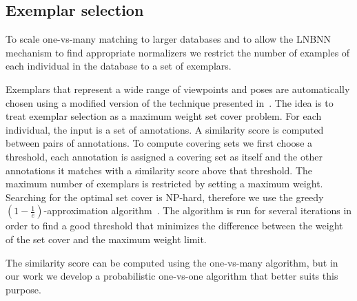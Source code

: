 \subsection{Exemplar selection}\label{sec:exempselect}
    To scale one-vs-many matching to larger databases and to allow the LNBNN
    mechanism to find appropriate normalizers we restrict the number of
    examples of each individual in the database to a set of exemplars.

    Exemplars that represent a wide range of viewpoints and poses are
      automatically chosen using a modified version of the technique presented
      in~\cite{oddone_mobile_2016}.
    The idea is to treat exemplar selection as a maximum weight set cover
      problem.
    For each individual, the input is a set of annotations.
    A similarity score is computed between pairs of annotations.
    To compute covering sets we first choose a threshold, each annotation is
      assigned a covering set as itself and the other annotations it matches
      with a similarity score above that threshold.
    The maximum number of exemplars is restricted by setting a maximum weight.
    Searching for the optimal set cover is NP-hard, therefore we use the
      greedy %
    $(1 - \frac{1}{e})$-approximation algorithm~\cite{michael_guide_1979}.
    The algorithm is run for several iterations in order to find a good
      threshold that minimizes the difference between the weight of the set
      cover and the maximum weight limit.

    The similarity score can be computed using the one-vs-many algorithm, but
      in our work we develop a probabilistic one-vs-one algorithm that better
      suits this purpose.
 
